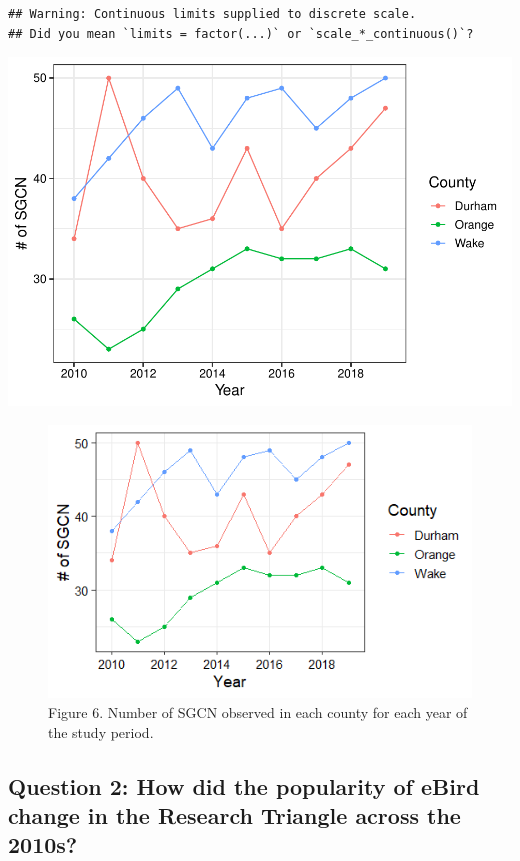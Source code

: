 \documentclass[
  12pt,
]{article}
\begin{document}
\begin{verbatim}
## Warning: Continuous limits supplied to discrete scale.
## Did you mean `limits = factor(...)` or `scale_*_continuous()`?
\end{verbatim}

\includegraphics{Project_Template_files/figure-latex/SGCN code-1.pdf}

\begin{figure}
\centering
\includegraphics{./Output/SGCN_plot.png}
\caption{Figure 6. Number of SGCN observed in each county for each year
of the study period.}
\end{figure}

\hypertarget{question-2-how-did-the-popularity-of-ebird-change-in-the-research-triangle-across-the-2010s}{%
\subsection{Question 2: How did the popularity of eBird change in the
Research Triangle across the
2010s?}\label{question-2-how-did-the-popularity-of-ebird-change-in-the-research-triangle-across-the-2010s}}
\end{document}
